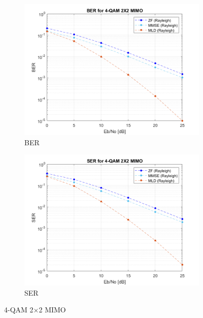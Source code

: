 \documentclass{article}
\begin{document}
\begin{figure}[H]
\begin{subfigure}{0.5\textwidth}
		\centerline{\includegraphics[width=1\textwidth]{a_Eb_BER.png}}
		\caption{BER}
	\end{subfigure}%
	\begin{subfigure}{0.5\textwidth}
		\centerline{\includegraphics[width=1\textwidth]{a_Eb_SER.png}}
		\caption{SER}
	\end{subfigure}%
	\caption{4-QAM 2$\times$2 MIMO}
\end{figure}
\end{document}
